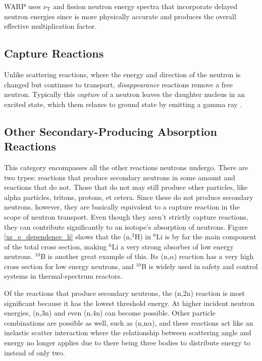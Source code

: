 WARP uses $\nu_\mathrm{T}$ and fission neutron energy spectra that incorporate delayed neutron energies since is more physically accurate and produces the overall effective multiplication factor.  

\subsection{Capture Reactions}

Unlike scattering reactions, where the energy and direction of the neutron is changed but continues to transport, \emph{disappearance} reactions remove a free neutron.  Typically this \emph{capture} of a neutron leaves the daughter nucleus in an excited state, which them relaxes to ground state by emitting a gamma ray \cite{krane}.


\subsection{Other Secondary-Producing Absorption Reactions}

This category encompasses all the other reactions neutrons undergo.  There are two types: reactions that produce secondary neutrons in some amount and reactions that do not.  Those that do not may still produce other particles, like alpha particles, tritons, protons, et cetera.  Since these do not produce secondary neutrons, however, they are basically equivalent to a capture reaction in the scope of neutron transport.  Even though they aren't strictly capture reactions, they can contribute significantly to an isotope's absorption of neutrons.  Figure \ref{xs_e_dependence_li} shows that the (n,$^3$H) in $^{6}$Li is by far the main component of the total cross section, making $^{6}$Li a very strong absorber of low energy neutrons.  $^{10}$B is another great example of this.  Its (n,$\alpha$) reaction has a very high cross section for low energy neutrons, and $^10$B is widely used in safety and control systems in thermal-spectrum reactors.

Of the reactions that produce secondary neutrons, the (n,2n) reaction is most significant because it has the lowest threshold energy.  At higher incident neutron energies, (n,3n) and even (n,4n) can become possible.  Other particle combinations are possible as well, such as (n,n$\alpha$), and these reactions act like an inelastic scatter interaction where the relationship between scattering angle and energy no longer applies due to there being three bodies to distribute energy to instead of only two.


